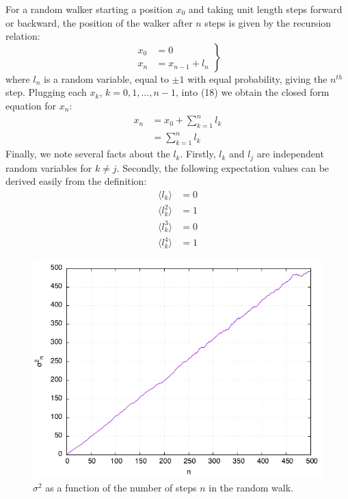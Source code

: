 \documentclass[12pt,letterpaper]{article}
\begin{document}
For a random walker starting a position $x_0$ and taking unit length steps forward or backward, the position of the walker after $n$ steps is given by the recursion relation:
\begin{equation}
	\left.\begin{aligned}
		x_0 &= 0 \\
		x_n &= x_{n-1} + l_{n}
	\end{aligned}
	\right\}
\end{equation}
where $l_{n}$ is a random variable, equal to $\pm1$ with equal probability, giving the $n^{th}$ step. Plugging each $x_{k}$, $k=0,1, ...,n-1$, into (18) we obtain the closed form equation for $x_n$:
\begin{align}
	x_n &= x_0 + \sum\limits_{k=1}^{n} l_k \nonumber \\
		&= \sum\limits_{k=1}^{n} l_k
\end{align}
Finally, we note several facts about the $l_{k}$. Firstly, $l_{k}$ and $l_{j}$ are independent random variables for $k\neq j$. Secondly, the following expectation values can be derived easily from the definition:
\begin{subequations}
	\begin{align}
		\langle l_k \rangle &= 0 \\ 
		\langle l_k^2 \rangle &= 1 \\
		\langle l_k^3 \rangle &= 0 \\
		\langle l_k^4 \rangle &= 1
	\end{align}
\end{subequations}

\begin{figure}[H]
	\centering
	\includegraphics[scale=0.6]{sigma2.png}
	\caption{$\sigma^{2}$ as a function of the number of steps $n$ in the random walk.}
\end{figure}
\end{document}
